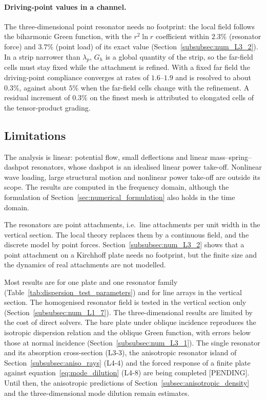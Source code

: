 {\paragraph{Driving-point values in a channel.} The three-dimensional point resonator needs no footprint: the local field follows the biharmonic Green function, with the $r^2\ln r$ coefficient within $2.3\%$ (resonator force) and $3.7\%$ (point load) of its exact value (Section~\ref{subsubsec:num_L3_2}). In a strip narrower than $\lambda_p$, $G_h$ is a global quantity of the strip, so the far-field cells must stay fixed while the attachment is refined. With a fixed far field the driving-point compliance converges at rates of $1.6$--$1.9$ and is resolved to about $0.3\%$, against about $5\%$ when the far-field cells change with the refinement. A residual increment of $0.3\%$ on the finest mesh is attributed to elongated cells of the tensor-product grading.

\subsection{Limitations}\label{subsec:disc_limitations}

The analysis is linear: potential flow, small deflections and linear mass--spring--dashpot resonators, whose dashpot is an idealised linear power take-off. Nonlinear wave loading, large structural motion and nonlinear power take-off are outside its scope. The results are computed in the frequency domain, although the formulation of Section~\ref{sec:numerical_formulation} also holds in the time domain.

The resonators are point attachments, i.e.\ line attachments per unit width in the vertical section. The local theory replaces them by a continuous field, and the discrete model by point forces. Section~\ref{subsubsec:num_L3_2} shows that a point attachment on a Kirchhoff plate needs no footprint, but the finite size and the dynamics of real attachments are not modelled.

Most results are for one plate and one resonator family (Table~\ref{tab:dispersion_test_parameters}) and for line arrays in the vertical section. The homogenised resonator field is tested in the vertical section only (Section~\ref{subsubsec:num_L1_7}). The three-dimensional results are limited by the cost of direct solvers. The bare plate under oblique incidence reproduces the isotropic dispersion relation and the oblique Green function, with errors below those at normal incidence (Section~\ref{subsubsec:num_L3_1}). The single resonator and its absorption cross-section (L3-3), the anisotropic resonator island of Section~\ref{subsubsec:aniso_rays} (L4-4) and the forced response of a finite plate against equation~\eqref{eq:mode_dilution} (L4-8) are being completed [PENDING]. Until then, the anisotropic predictions of Section~\ref{subsec:anisotropic_density} and the three-dimensional mode dilution remain estimates.

}
